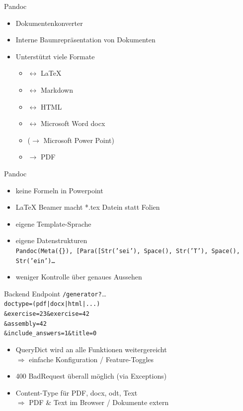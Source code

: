 \documentclass[english,hangout]{beamer}
\begin{document}
\begin{frame}{Pandoc}
    \begin{itemize}
        \item Dokumentenkonverter
        \item Interne Baumrepräsentation von Dokumenten
        \item Unterstützt viele Formate
        \begin{itemize}
            \item $\leftrightarrow$ \LaTeX
            \item $\leftrightarrow$ Markdown
            \item $\leftrightarrow$ HTML
            \item $\leftrightarrow$ Microsoft Word docx
            \item ($\rightarrow$ Microsoft Power Point)
            \item $\rightarrow$ PDF
        \end{itemize}
    \end{itemize}
\end{frame}

\begin{frame}{Pandoc}
    \begin{itemize}
        \item keine Formeln in Powerpoint
        \item LaTeX Beamer macht *.tex Datein statt Folien
        \item eigene Template-Sprache
        \item eigene Datenstrukturen\\
            {\tiny \texttt{Pandoc(Meta(\{\}), [Para([Str('sei'), Space(), Str('T'), Space(), Str('ein')\dots } }
        \item weniger Kontrolle über genaues Aussehen
    \end{itemize}
\end{frame}


\begin{frame}{Backend Endpoint}
    \texttt{/generator?}\dots\\
    \quad\quad\quad\texttt{doctype=(pdf|docx|html|...)}\\
    \quad\quad\quad\texttt{\&exercise=23\&exercise=42}\\
    \quad\quad\quad\texttt{\&assembly=42}\\
    \quad\quad\quad\texttt{\&include\_answers=1\&title=0}\\
    \begin{itemize}
        \item QueryDict wird an alle Funktionen weitergereicht\\
            \quad $\Rightarrow$ einfache Konfiguration / Feature-Toggles
        \item 400 BadRequest überall möglich (via Exceptions)
        \item Content-Type für PDF, docx, odt, Text\\
            \quad $\Rightarrow$ PDF \& Text im Browser / Dokumente extern
    \end{itemize}
\end{frame}
\end{document}
